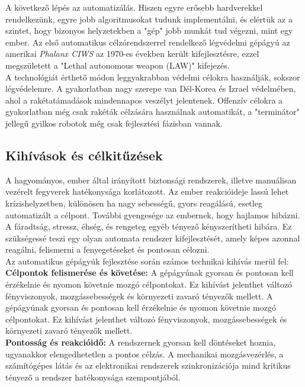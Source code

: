 \documentclass[12pt,a4paper]{article}
\begin{document}
A következő lépés az automatizálás. Hiszen egyre erősebb hardverekkel rendelkezünk, egyre jobb algoritmusokat tudunk implementálni, és elértük az a szintet, hogy bizonyos helyzetekben a "gép" jobb munkát tud végezni, mint egy ember. Az első automatikus célzórendszerrel rendelkező légvédelmi gépágyú az amerikai \textsl{Phalanx CIWS} \cite{CIWS} az 1970-es években került kifejlesztésre, ezzel megszületett a "Lethal autonomous weapon (LAW)" kifejezés.\\

A technológiát érthető módon leggyakrabban védelmi célokra használják, sokszor légvédelemre. A gyakorlatban nagy szerepe van Dél-Korea és Izrael védelmében, ahol a rakétatámadások mindennapos veszélyt jelentenek. Offenzív célokra a gyakorlatban még csak rakéták célzására használnak automatikát, a "terminátor" jellegű gyilkos robotok még csak fejlesztési fázisban vannak.
\pagebreak 

\subsection{Kihívások és célkitűzések}

A hagyományos, ember által irányított biztonsági rendszerek, illetve manuálisan vezérelt fegyverek hatékonysága korlátozott. Az ember reakcióideje lassú lehet krízishelyzetben, különösen ha nagy sebességű, gyors reagálású, esetleg automatizált a célpont. További gyengesége az embernek, hogy hajlamos hibázni. A fáradtság, stressz, éhség, és rengeteg egyéb tényező kényszerítheti hibára. Ez szükségessé teszi egy olyan automata rendszer kifejlesztését, amely képes azonnal reagálni, felismerni a fenyegetéseket és pontosan célozni.\\

Az automatikus gépágyúk fejlesztése során számos technikai kihívás merül fel:\\

\textbf{Célpontok felismerése és követése:} A gépágyúnak gyorsan és pontosan kell érzékelnie és nyomon követnie mozgó célpontokat. Ez kihívást jelenthet változó fényviszonyok, mozgássebességek és környezeti zavaró tényezők mellett. A gépágyúnak gyorsan és pontosan kell érzékelnie és nyomon követnie mozgó célpontokat. Ez kihívást jelenthet változó fényviszonyok, mozgássebességek és környezeti zavaró tényezők mellett. \\

\textbf{Pontosság és reakcióidő:} A rendszernek gyorsan kell döntéseket hoznia, ugyanakkor elengedhetetlen a pontos célzás. A mechanikai mozgásvezérlés, a számítógépes látás és az elektronikai rendszerek szinkronizációja mind kritikus tényező a rendszer hatékonysága szempontjából. \\
\end{document}
